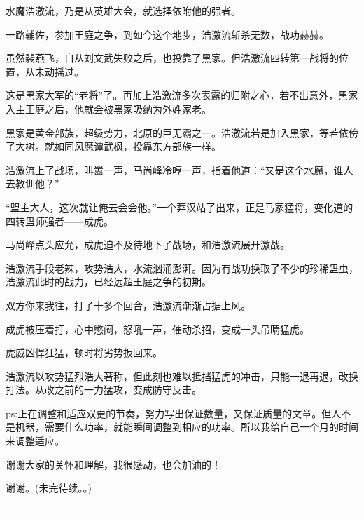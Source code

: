 \begin{this_body}
水魔浩激流，乃是从英雄大会，就选择依附他的强者。

一路辅佐，参加王庭之争，到如今这个地步，浩激流斩杀无数，战功赫赫。

虽然裴燕飞，自从刘文武失败之后，也投靠了黑家。但浩激流四转第一战将的位置，从未动摇过。

这是黑家大军的“老将”了。再加上浩激流多次表露的归附之心，若不出意外，黑家入主王庭之后，他就会被黑家吸纳为外姓家老。

黑家是黄金部族，超级势力，北原的巨无霸之一。浩激流若是加入黑家，等若依傍了大树。就如同风魔谭武枫，投靠东方部族一样。

浩激流上了战场，叫嚣一声，马尚峰冷哼一声，指着他道：“又是这个水魔，谁人去教训他？”

“盟主大人，这次就让俺去会会他。”一个莽汉站了出来，正是马家猛将，变化道的四转蛊师强者——成虎。

马尚峰点头应允，成虎迫不及待地下了战场，和浩激流展开激战。

浩激流手段老辣，攻势浩大，水流汹涌澎湃。因为有战功换取了不少的珍稀蛊虫，浩激流此时的战力，已经远超王庭之争的初期。

双方你来我往，打了十多个回合，浩激流渐渐占据上风。

成虎被压着打，心中憋闷，怒吼一声，催动杀招，变成一头吊睛猛虎。

虎威凶悍狂猛，顿时将劣势扳回来。

浩激流以攻势猛烈浩大著称，但此刻也难以抵挡猛虎的冲击，只能一退再退，改换打法。从改之前的一力猛攻，变成防守反击。

ps:正在调整和适应双更的节奏，努力写出保证数量，又保证质量的文章。但人不是机器，需要什么功率，就能瞬间调整到相应的功率。所以我给自己一个月的时间来调整适应。

谢谢大家的关怀和理解，我很感动，也会加油的！

谢谢。(未完待续。。)

------------

\end{this_body}

